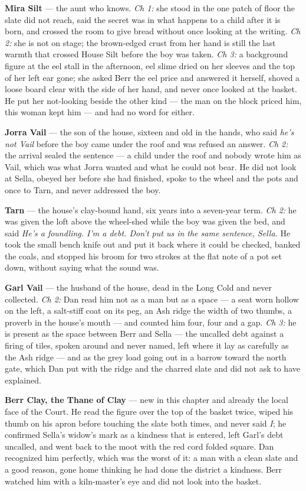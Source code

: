 \documentclass{design/chronicle}
\begin{document}
{\textbf{Mira Silt} — the aunt who knows. \emph{Ch 1:} she stood in the one patch of floor the slate did not reach, said the secret was in what happens to a child after it is born, and crossed the room to give bread without once looking at the writing. \emph{Ch 2:} she is not on stage; the brown-edged crust from her hand is still the last warmth that crossed House Silt before the boy was taken. \emph{Ch 3:} a background figure at the eel stall in the afternoon, eel slime dried on her sleeves and the top of her left ear gone; she asked Berr the eel price and answered it herself, shoved a loose board clear with the side of her hand, and never once looked at the basket. He put her not-looking beside the other kind --- the man on the block priced him, this woman kept him --- and had no word for either.

\textbf{Jorra Vail} — the son of the house, sixteen and old in the hands, who said \emph{he’s not Vail} before the boy came under the roof and was refused an answer. \emph{Ch 2:} the arrival sealed the sentence --- a child under the roof and nobody wrote him as Vail, which was what Jorra wanted and what he could not bear. He did not look at Sella, obeyed her before she had finished, spoke to the wheel and the pots and once to Tarn, and never addressed the boy.

\textbf{Tarn} — the house’s clay-bound hand, six years into a seven-year term. \emph{Ch 2:} he was given the loft above the wheel-shed while the boy was given the bed, and said \emph{He’s a foundling. I’m a debt. Don’t put us in the same sentence, Sella.} He took the small bench knife out and put it back where it could be checked, banked the coals, and stopped his broom for two strokes at the flat note of a pot set down, without saying what the sound was.

\textbf{Garl Vail} — the husband of the house, dead in the Long Cold and never collected. \emph{Ch 2:} Dan read him not as a man but as a space --- a seat worn hollow on the left, a salt-stiff coat on its peg, an Ash ridge the width of two thumbs, a proverb in the house’s mouth --- and counted him four, four and a gap. \emph{Ch 3:} he is present as the space between Berr and Sella --- the uncalled debt against a firing of tiles, spoken around and never named, left where it lay as carefully as the Ash ridge --- and as the grey load going out in a barrow toward the north gate, which Dan put with the ridge and the charred slate and did not ask to have explained.

\textbf{Berr Clay, the Thane of Clay} — new in this chapter and already the local face of the Court. He read the figure over the top of the basket twice, wiped his thumb on his apron before touching the slate both times, and never said \emph{I}; he confirmed Sella’s widow’s mark as a kindness that is entered, left Garl’s debt uncalled, and went back to the moot with the red cord folded square. Dan recognized him perfectly, which was the worst of it: a man with a clean slate and a good reason, gone home thinking he had done the district a kindness. Berr watched him with a kiln-master’s eye and did not look into the basket.

}
\end{document}
